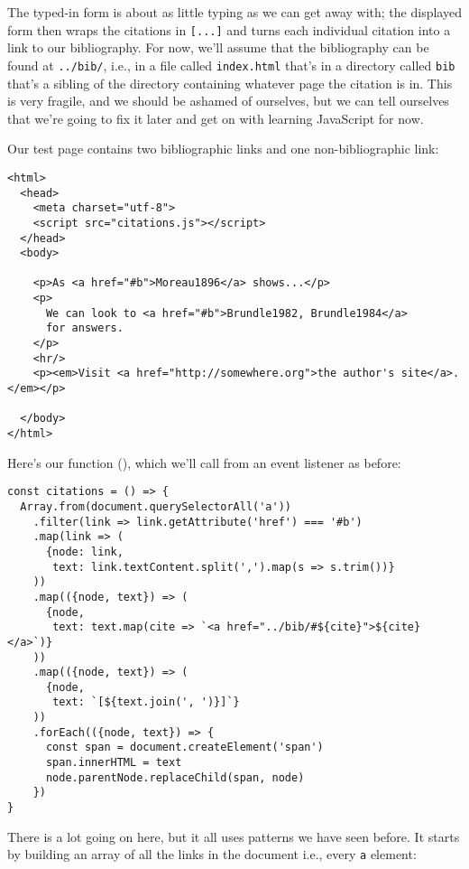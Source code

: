 The typed-in form is about as little typing as we can get away with;
the displayed form then wraps the citations in \texttt{[...]}
and turns each individual citation into a link to our bibliography.
For now,
we'll assume that the bibliography can be found at \texttt{../bib/},
i.e.,
in a file called \texttt{index.html} that's in a directory called \texttt{bib}
that's a sibling of the directory containing whatever page the citation is in.
This is very fragile,
and we should be ashamed of ourselves,
but we can tell ourselves that we're going to fix it later
and get on with learning JavaScript for now.

Our test page contains two bibliographic links
and one non-bibliographic link:

\begin{verbatim}
<html>
  <head>
    <meta charset="utf-8">
    <script src="citations.js"></script>
  </head>
  <body>

    <p>As <a href="#b">Moreau1896</a> shows...</p>
    <p>
      We can look to <a href="#b">Brundle1982, Brundle1984</a>
      for answers.
    </p>
    <hr/>
    <p><em>Visit <a href="http://somewhere.org">the author's site</a>.</em></p>

  </body>
</html>
\end{verbatim}

\noindent
Here's our function (),
which we'll call from an event listener as before:

\begin{verbatim}
const citations = () => {
  Array.from(document.querySelectorAll('a'))
    .filter(link => link.getAttribute('href') === '#b')
    .map(link => (
      {node: link,
       text: link.textContent.split(',').map(s => s.trim())}
    ))
    .map(({node, text}) => (
      {node,
       text: text.map(cite => `<a href="../bib/#${cite}">${cite}</a>`)}
    ))
    .map(({node, text}) => (
      {node,
       text: `[${text.join(', ')}]`}
    ))
    .forEach(({node, text}) => {
      const span = document.createElement('span')
      span.innerHTML = text
      node.parentNode.replaceChild(span, node)
    })
}
\end{verbatim}


There is a lot going on here,
but it all uses patterns we have seen before.
It starts by building an array of all the links in the document
i.e., every \texttt{a} element:


